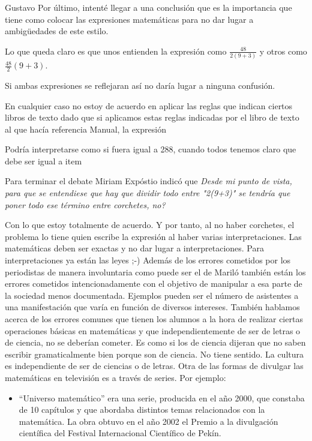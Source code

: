 \begin{opin}{\guscolor}{Gustavo}
Por último, intenté llegar a una conclusión que es la importancia que tiene como colocar las expresiones matemáticas para no dar lugar a ambigüedades de este estilo.


Lo que queda claro es que unos entienden la expresión como $\frac{48}{2(9+3)}$ y otros como $\frac{48}{2}(9+3)$.

Si ambas expresiones se reflejaran así no daría lugar a ninguna confusión.

En cualquier caso no estoy de acuerdo en aplicar las reglas que indican ciertos libros de texto dado que si aplicamos estas reglas indicadas por el libro de texto al que hacía referencia Manual, la expresión 

Podría interpretarse como si fuera igual a 288, cuando todos tenemos claro que debe ser igual a item 

Para terminar el debate Miriam Expóstio indicó que 
\textit{Desde mi punto de vista, para que se entendiese que hay que dividir todo entre "2(9+3)" se tendría que poner todo ese término entre corchetes, no?}


Con lo que estoy totalmente de acuerdo. Y por tanto, al no haber corchetes, el problema lo tiene quien escribe la expresión al haber varias interpretaciones.
Las matemáticas deben ser exactas y no dar lugar a interpretaciones. Para interpretaciones ya están las leyes ;-)
Además de los errores cometidos por los periodistas de manera involuntaria como puede ser el de Mariló también están los errores cometidos intencionadamente con el objetivo de manipular a esa parte de la sociedad menos documentada. Ejemplos pueden ser el número de asistentes a una manifestación que varía en función de diversos intereses.
También hablamos acerca de los errores comunes que tienen los alumnos a la hora de realizar ciertas operaciones básicas en matemáticas y que independientemente de ser de letras o de ciencia, no se deberían cometer. Es como si los de ciencia dijeran que no saben escribir gramaticalmente bien porque son de ciencia. No tiene sentido. La cultura es independiente de ser de ciencias o de letras.
Otra de las formas de divulgar las matemáticas en televisión es a través de series. Por ejemplo:

\begin{itemize}
\item “Universo matemático” era una serie, producida en el año 2000, que constaba de 10 capítulos y que abordaba distintos temas relacionados con la matemática. La obra obtuvo en el año 2002 el Premio a la divulgación científica del Festival Internacional Científico de Pekín. 


\end{itemize}
\end{opin}
